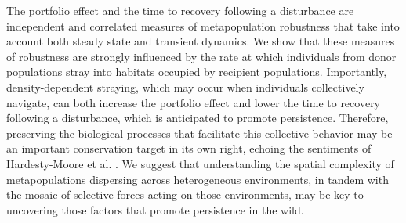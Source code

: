 \documentclass{revtex4}
\begin{document}

The portfolio effect and the time to recovery following a disturbance are independent and correlated measures of metapopulation robustness that take into account both steady state and transient dynamics.
We show that these measures of robustness are strongly influenced by the rate at which individuals from donor populations stray into habitats occupied by recipient populations. 
Importantly, density-dependent straying, which may occur when individuals collectively navigate, can both increase the portfolio effect and lower the time to recovery following a disturbance, which is anticipated to promote persistence. 
Therefore, preserving the biological processes that facilitate this collective behavior may be an important conservation target in its own right, echoing the sentiments of  Hardesty-Moore et al. \citep{HardestyMoore:wg}. 
We suggest that understanding the spatial complexity of metapopulations dispersing across heterogeneous environments, in tandem with the mosaic of selective forces acting on those environments, may be key to uncovering those factors that promote persistence in the wild.
\\ \\
\end{document}
